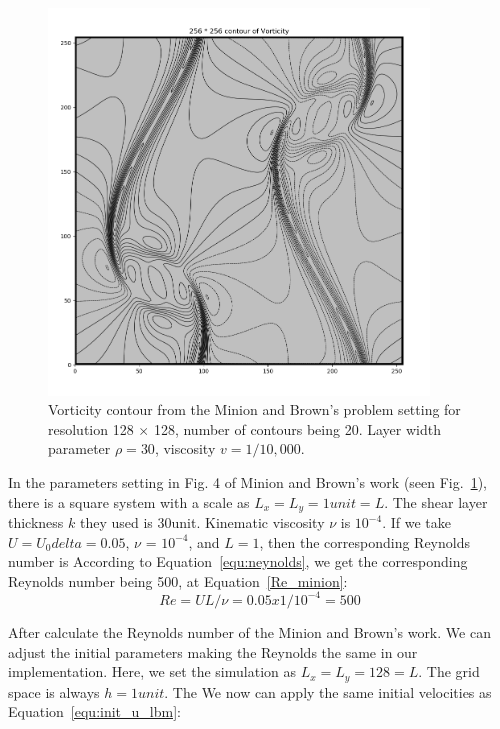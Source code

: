 \begin{figure}[!tb]
   \centering
       \includegraphics[width=0.9\textwidth]{figures/double_c_256.png}
       \caption{Vorticity contour from the Minion and Brown's problem\cite{minion1997performance} setting  for resolution 128 $\times$ 128, number of contours being 20. Layer width parameter $\rho = 30$, viscosity $v=1/10,000$. }
       \label{fig:minion}
\end{figure}
In the parameters setting in Fig. 4 of Minion and Brown's work (seen Fig.~\ref{fig:minion}), there is a square system with a scale as $L_x = L_y = 1 unit = L$. The shear layer thickness $k$ they used is 30unit. Kinematic viscosity $\nu$ is $10^{-4}$. If we take $U = U_0 delta = 0.05$, $\nu$ = $10^{-4}$, and $L = 1$, then the corresponding Reynolds number is According to Equation~\ref{equ:neynolds}, we get the corresponding Reynolds number being 500, at Equation~\ref{Re_minion}:
\begin{equation}
\label{Re_minion}
    Re = UL / \nu = 0.05 x 1 / 10^{-4} = 500
\end{equation}

After calculate the Reynolds number of the Minion and Brown's work. We can adjust the initial parameters making the Reynolds the same in our implementation. Here, we set the simulation as $L_x = L_y = 128 = L$. The grid space is always $h = 1 unit$. The We now can apply the same initial velocities as Equation~\ref{equ:init_u_lbm}:

